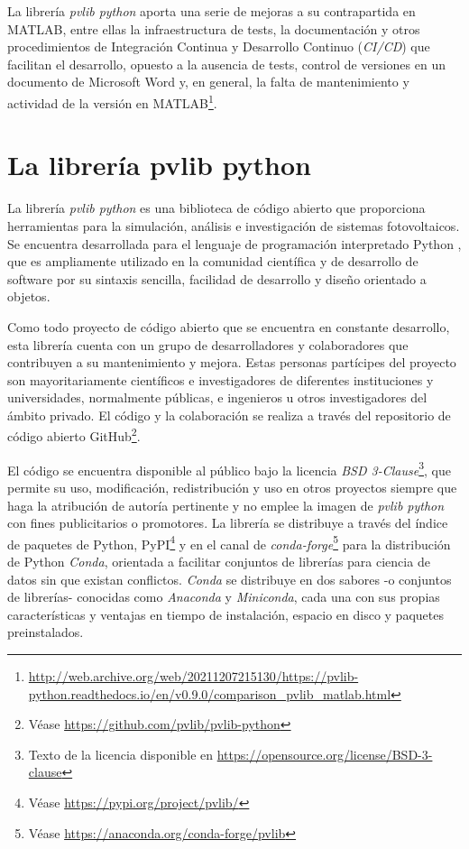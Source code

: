 La librería \textit{pvlib python} aporta una serie de mejoras a su contrapartida en MATLAB, entre ellas la infraestructura de tests, la documentación y otros procedimientos de Integración Continua y Desarrollo Continuo (\textit{CI/CD}) que facilitan el desarrollo, opuesto a la ausencia de tests, control de versiones en un documento de Microsoft Word y, en general, la falta de mantenimiento y actividad de la versión en MATLAB\footnote{\url{http://web.archive.org/web/20211207215130/https://pvlib-python.readthedocs.io/en/v0.9.0/comparison_pvlib_matlab.html}}.

\section{La librería pvlib python} \label{sct:pvlib}

La librería \textit{pvlib python} es una biblioteca de código abierto que proporciona herramientas para la simulación, análisis e investigación de sistemas fotovoltaicos. Se encuentra desarrollada para el lenguaje de programación interpretado Python \cite{CS-R9526}, que es ampliamente utilizado en la comunidad científica y de desarrollo de software por su sintaxis sencilla, facilidad de desarrollo y diseño orientado a objetos.

Como todo proyecto de código abierto que se encuentra en constante desarrollo, esta librería cuenta con un grupo de desarrolladores y colaboradores que contribuyen a su mantenimiento y mejora. Estas personas partícipes del proyecto son mayoritariamente científicos e investigadores de diferentes instituciones y universidades, normalmente públicas, e ingenieros u otros investigadores del ámbito privado. El código y la colaboración se realiza a través del repositorio de código abierto GitHub\footnote{Véase \url{https://github.com/pvlib/pvlib-python}}.

El código se encuentra disponible al público bajo la licencia \textit{BSD 3-Clause}\footnote{Texto de la licencia disponible en \url{https://opensource.org/license/BSD-3-clause}}, que permite su uso, modificación, redistribución y uso en otros proyectos siempre que haga la atribución de autoría pertinente y no emplee la imagen de \textit{pvlib python} con fines publicitarios o promotores. La librería se distribuye a través del índice de paquetes de Python, PyPI\footnote{Véase \url{https://pypi.org/project/pvlib/}} y en el canal de \textit{conda-forge}\footnote{Véase \url{https://anaconda.org/conda-forge/pvlib}} para la distribución de Python \textit{Conda}, orientada a facilitar conjuntos de librerías para ciencia de datos sin que existan conflictos. \textit{Conda} se distribuye en dos sabores -o conjuntos de librerías- conocidas como \textit{Anaconda} y \textit{Miniconda}, cada una con sus propias características y ventajas en tiempo de instalación, espacio en disco y paquetes preinstalados.

